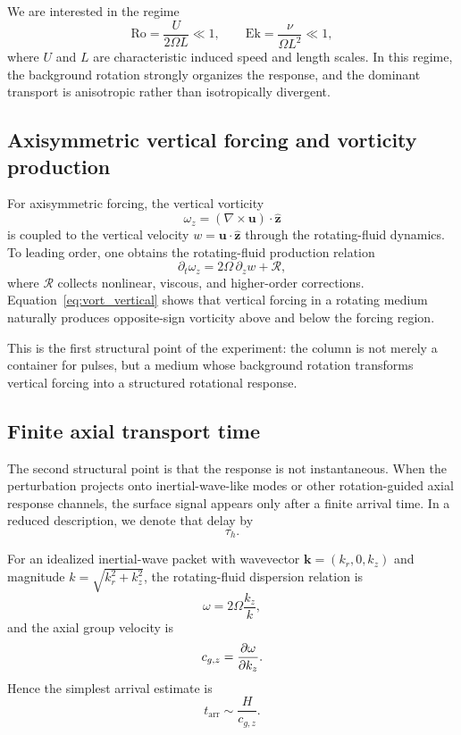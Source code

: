 \documentclass[11pt,a4paper]{article}
\begin{document}
We are interested in the regime
\begin{equation}
\mathrm{Ro}=\frac{U}{2\Omega L}\ll 1,
\qquad
\mathrm{Ek}=\frac{\nu}{\Omega L^2}\ll 1,
\label{eq:RoEk}
\end{equation}
where $U$ and $L$ are characteristic induced speed and length scales. In this regime, the background rotation strongly organizes the response, and the dominant transport is anisotropic rather than isotropically divergent.

\subsection{Axisymmetric vertical forcing and vorticity production}

For axisymmetric forcing, the vertical vorticity
\begin{equation}
\omega_z = (\nabla\times \mathbf u)\cdot \hat{\mathbf z}
\end{equation}
is coupled to the vertical velocity $w=\mathbf u\cdot \hat{\mathbf z}$ through the rotating-fluid dynamics. To leading order, one obtains the rotating-fluid production relation
\begin{equation}
\partial_t \omega_z = 2\Omega\,\partial_z w + \mathcal{R},
\label{eq:vort_vertical}
\end{equation}
where $\mathcal{R}$ collects nonlinear, viscous, and higher-order corrections. Equation~\eqref{eq:vort_vertical} shows that vertical forcing in a rotating medium naturally produces opposite-sign vorticity above and below the forcing region.

This is the first structural point of the experiment: the column is not merely a container for pulses, but a medium whose background rotation transforms vertical forcing into a structured rotational response.

\subsection{Finite axial transport time}

The second structural point is that the response is not instantaneous. When the perturbation projects onto inertial-wave-like modes or other rotation-guided axial response channels, the surface signal appears only after a finite arrival time. In a reduced description, we denote that delay by
\begin{equation}
\tau_h.
\end{equation}

For an idealized inertial-wave packet with wavevector $\mathbf k=(k_r,0,k_z)$ and magnitude $k=\sqrt{k_r^2+k_z^2}$, the rotating-fluid dispersion relation is
\begin{equation}
\omega = 2\Omega \frac{k_z}{k},
\label{eq:inertial_dispersion}
\end{equation}
and the axial group velocity is
\begin{equation}
c_{g,z} = \pdv{\omega}{k_z}.
\end{equation}
Hence the simplest arrival estimate is
\begin{equation}
t_{\mathrm{arr}} \sim \frac{H}{c_{g,z}}.
\label{eq:t_arr}
\end{equation}
\end{document}
